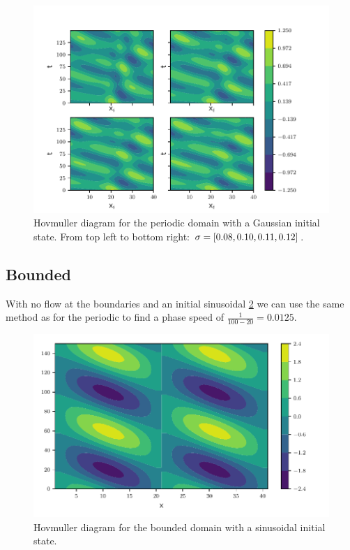 \begin{figure}[htp]
  \centering
  \includegraphics[width=\textwidth]{../figures/hovmuller_sigma.pdf}
  \caption{Hovmuller diagram for the periodic domain with a Gaussian initial
  state.
  From top left to bottom right: $\sigma = \left[0.08, 0.10, 0.11, 0.12\right]$.
  }
  \label{fig:periodic_gauss}
\end{figure}



\subsection{Bounded}

With no flow at the boundaries and an initial sinusoidal \cref{fig:bounded_sine}
we can use the same method as for the periodic to find a phase speed of
$\frac{1}{100 - 20} = 0.0125$.


\begin{figure}[htp]
  \centering
  \includegraphics[width=\textwidth]{../figures/psi_bounded_centered_sine.pdf}
  \caption{Hovmuller diagram for the bounded domain with a sinusoidal initial
  state.}
  \label{fig:bounded_sine}
\end{figure}


